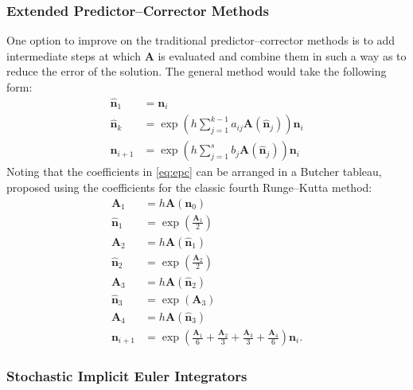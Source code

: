 \documentclass[3p,authoryear]{elsarticle}
\newcommand{\vect}[1]{\mathbf{#1}} %
\begin{document}
\subsubsection{Extended Predictor--Corrector Methods}

One option to improve on the traditional predictor--corrector methods is to add
intermediate steps at which $\vect{A}$ is evaluated and combine them in such a
way as to reduce the error of the solution. The general method would take the
following form:
\begin{equation}
  \label{eq:epc}
  \begin{split}
    \hat{\vect{n}}_1 &= \vect{n}_i \\
    \hat{\vect{n}}_k &= \exp \left( h \sum_{j=1}^{k-1} a_{ij} \vect{A}(\hat{\vect{n}}_j) \right) \vect{n}_i \\
    \vect{n}_{i+1} &= \exp \left( h \sum_{j=1}^{s} b_{j} \vect{A}(\hat{\vect{n}}_j) \right) \vect{n}_i
  \end{split}
\end{equation}
Noting that the coefficients in \cref{eq:epc} can be arranged in a Butcher
tableau, \citet{josey2016jcp} proposed using the coefficients for the classic
fourth Runge--Kutta method:
\begin{equation}
  \begin{split}
    \vect{A}_1 &= h\vect{A}(\vect{n}_0) \\
    \hat{\vect{n}}_1 &= \exp \left ( \frac{\vect{A}_1}{2} \right ) \\
    \vect{A}_2 &= h\vect{A}(\hat{\vect{n}}_1) \\
    \hat{\vect{n}}_2 &= \exp \left ( \frac{\vect{A}_2}{2} \right ) \\
    \vect{A}_3 &= h \vect{A}(\hat{\vect{n}}_2) \\
    \hat{\vect{n}}_3 &= \exp \left ( \vect{A}_3 \right ) \\
    \vect{A}_4 &= h\vect{A}(\hat{\vect{n}}_3) \\
    \vect{n}_{i+1} &= \exp \left ( \frac{\vect{A}_1}{6} + \frac{\vect{A}_2}{3}
      + \frac{\vect{A}_3}{3} + \frac{\vect{A}_4}{6} \right ) \vect{n}_i.
  \end{split}
\end{equation}

\subsubsection{Stochastic Implicit Euler Integrators}
\end{document}
